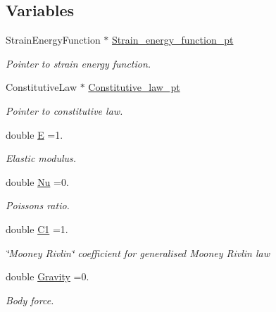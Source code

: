 \subsection*{Variables}
\begin{DoxyCompactItemize}
\item 
Strain\+Energy\+Function $\ast$ \hyperlink{namespaceGlobal__Physical__Variables_af6838abf46c7850f1ee0b3452d6d2498}{Strain\+\_\+energy\+\_\+function\+\_\+pt}
\begin{DoxyCompactList}\small\item\em Pointer to strain energy function. \end{DoxyCompactList}\item 
Constitutive\+Law $\ast$ \hyperlink{namespaceGlobal__Physical__Variables_a5d5f19442938130d36ee7476ae25049c}{Constitutive\+\_\+law\+\_\+pt}
\begin{DoxyCompactList}\small\item\em Pointer to constitutive law. \end{DoxyCompactList}\item 
double \hyperlink{namespaceGlobal__Physical__Variables_a09a019474b7405b35da2437f7779bc7e}{E} =1.
\begin{DoxyCompactList}\small\item\em Elastic modulus. \end{DoxyCompactList}\item 
double \hyperlink{namespaceGlobal__Physical__Variables_a3962c36313826b19f216f6bbbdd6a477}{Nu} =0.
\begin{DoxyCompactList}\small\item\em Poisson\textquotesingle{}s ratio. \end{DoxyCompactList}\item 
double \hyperlink{namespaceGlobal__Physical__Variables_a849754fa7155c1a31481674ce4845658}{C1} =1.
\begin{DoxyCompactList}\small\item\em \char`\"{}\+Mooney Rivlin\char`\"{} coefficient for generalised Mooney Rivlin law \end{DoxyCompactList}\item 
double \hyperlink{namespaceGlobal__Physical__Variables_a8b80d3e8d63b8d0a0ed435a2dd7fe2ad}{Gravity} =0.
\begin{DoxyCompactList}\small\item\em Body force. \end{DoxyCompactList}\end{DoxyCompactItemize}


